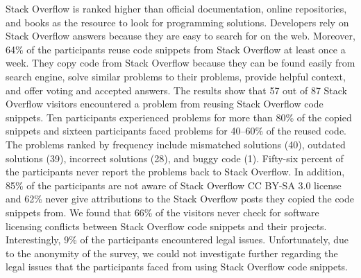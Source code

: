 \documentclass[a4paper,twoside,10pt]{reviewresponse}
\begin{document}
Stack Overflow is ranked higher than official documentation, online repositories, and books as the resource to look for programming solutions. Developers rely on Stack Overflow answers because they are easy to search for on the web. Moreover, 64\% of the participants reuse code snippets from Stack Overflow at least once a week. They copy code from Stack Overflow because they can be found easily from search engine, solve similar problems to their problems, provide helpful context, and offer voting and accepted answers.
The results show that 57 out of 87 Stack Overflow visitors encountered a problem from reusing Stack Overflow code snippets. Ten participants experienced problems for more than 80\% of the copied snippets and sixteen participants faced problems for 40--60\% of the reused code. The problems ranked by frequency include mismatched solutions (40), outdated solutions (39), incorrect solutions (28), and buggy code (1). Fifty-six percent of the participants never report the problems back to Stack Overflow. In addition, 85\% of the participants are not aware of Stack Overflow CC BY-SA 3.0 license and 62\% never give attributions to the Stack Overflow posts they copied the code snippets from. We found that 66\% of the visitors never check for software licensing conflicts between Stack Overflow code snippets and their projects. Interestingly, 9\% of the participants encountered legal issues. Unfortunately, due to the anonymity of the survey, we could not investigate further regarding the legal issues that the participants faced from using Stack Overflow code snippets.

\end{document}
